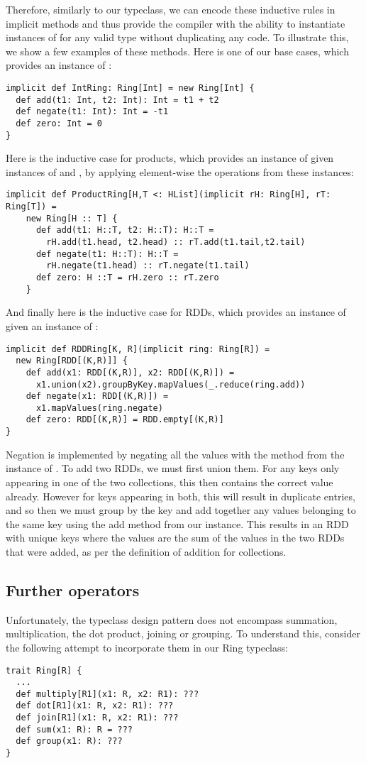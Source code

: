 Therefore, similarly to our  typeclass, we can encode these inductive rules in implicit methods and thus provide the compiler with the ability to instantiate instances of  for any valid type  without duplicating any code. To illustrate this, we show a few examples of these methods. Here is one of our base cases, which provides an instance of :
\vs\begin{lstlisting}
implicit def IntRing: Ring[Int] = new Ring[Int] {
  def add(t1: Int, t2: Int): Int = t1 + t2
  def negate(t1: Int): Int = -t1
  def zero: Int = 0
}
\end{lstlisting}\vs
Here is the inductive case for products, which provides an instance of  given instances of  and , by applying element-wise the operations from these instances:
\vs\begin{lstlisting}
implicit def ProductRing[H,T <: HList](implicit rH: Ring[H], rT: Ring[T]) =
    new Ring[H :: T] {
      def add(t1: H::T, t2: H::T): H::T =
        rH.add(t1.head, t2.head) :: rT.add(t1.tail,t2.tail)
      def negate(t1: H::T): H::T =
        rH.negate(t1.head) :: rT.negate(t1.tail)
      def zero: H ::T = rH.zero :: rT.zero
    }
\end{lstlisting}\vs
And finally here is the inductive case for RDDs, which provides an instance of  given an instance of :
\vs\begin{lstlisting}
implicit def RDDRing[K, R](implicit ring: Ring[R]) =
  new Ring[RDD[(K,R)]] {
    def add(x1: RDD[(K,R)], x2: RDD[(K,R)]) =
      x1.union(x2).groupByKey.mapValues(_.reduce(ring.add))
    def negate(x1: RDD[(K,R)]) =
      x1.mapValues(ring.negate)
    def zero: RDD[(K,R)] = RDD.empty[(K,R)] 
}
\end{lstlisting}\vs
Negation is implemented by negating all the values with the method from the instance of . To add two RDDs, we must first union them. For any keys only appearing in one of the two collections, this then contains the correct value already. However for keys appearing in both, this will result in duplicate entries, and so then we must group by the key and add together any values belonging to the same key using the add method from our  instance. This results in an RDD with unique keys where the values are the sum of the values in the two RDDs that were added, as per the definition of addition for collections.

\subsection{Further operators} \label{furtheroperators}
Unfortunately, the typeclass design pattern does not encompass summation, multiplication, the dot product, joining or grouping. To understand this, consider the following attempt to incorporate them in our Ring typeclass:
\vs\begin{lstlisting}
trait Ring[R] {
  ...
  def multiply[R1](x1: R, x2: R1): ???
  def dot[R1](x1: R, x2: R1): ???
  def join[R1](x1: R, x2: R1): ???
  def sum(x1: R): R = ???
  def group(x1: R): ???
}
\end{lstlisting}\vs

